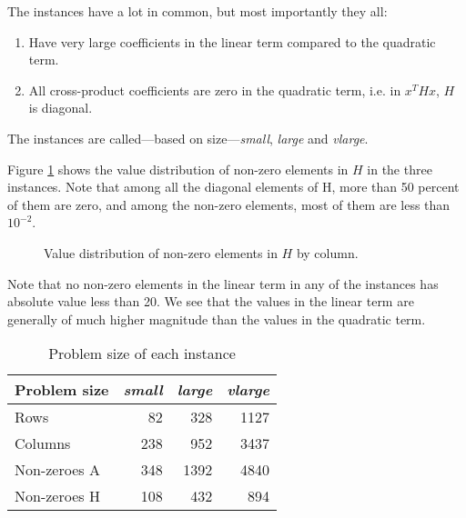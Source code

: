 The instances have a lot in common, but most importantly they all:
\begin{enumerate}
\item Have very large coefficients in the linear term compared to the
quadratic term.
\item All cross-product coefficients are zero in the quadratic term, i.e. in
$x^T H x$, $H$ is diagonal.
\end{enumerate}

The instances are called---based on size---\textit{small}, \textit{large}
and \textit{vlarge}.

Figure \ref{fig:histH} shows the value distribution of non-zero elements in $H$
in the three instances. Note that among all the diagonal elements of H, more
than 50 percent of them are zero, and among the non-zero elements, most of them
are less than $10^{-2}$.
\begin{figure}[ht!]
\begin{center}

\end{center}
\caption{Value distribution of non-zero elements in $H$ by column.}
\label{fig:histH}
\end{figure}
Note that no non-zero elements in the linear term in any of the instances
has absolute value less than 20. We see that the values in the linear term
are generally of much higher magnitude than the values in the quadratic term.

\begin{table}[ht!]
    \centering
    \caption{Problem size of each instance}
    \begin{tabular}{lrrr}
    Problem size & \textit{small} & \textit{large} & \textit{vlarge} \\\hline
    Rows         & 82             & 328            & 1127 \\
    Columns      & 238            & 952            & 3437 \\
    Non-zeroes A & 348            & 1392           & 4840 \\
    Non-zeroes H & 108            & 432            & 894 \\
    \end{tabular}
    \label{table:sizes}
\end{table}


